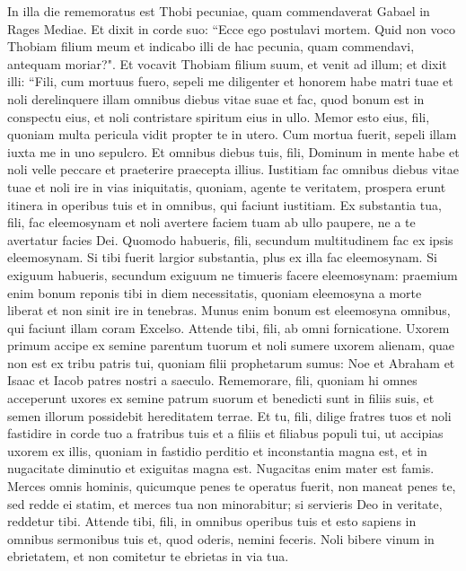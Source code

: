 \begin{biblechapter}  
\verse In illa die rememoratus est Thobi pecuniae, quam commendaverat Gabael in Rages Mediae. 
\verse Et dixit in corde suo: “Ecce ego postulavi mortem. Quid non voco Thobiam filium meum et indicabo illi de hac pecunia, quam commendavi, antequam moriar?". 
\verse Et vocavit Thobiam filium suum, et venit ad illum; et dixit illi: “Fili, cum mortuus fuero, sepeli me diligenter et honorem habe matri tuae et noli derelinquere illam omnibus diebus vitae suae et fac, quod bonum est in conspectu eius, et noli contristare spiritum eius in ullo. 
\verse Memor esto eius, fili, quoniam multa pericula vidit propter te in utero. Cum mortua fuerit, sepeli illam iuxta me in uno sepulcro. 
\verse Et omnibus diebus tuis, fili, Dominum in mente habe et noli velle peccare et praeterire praecepta illius. Iustitiam fac omnibus diebus vitae tuae et noli ire in vias iniquitatis,  
\verse quoniam, agente te veritatem, prospera erunt itinera in operibus tuis et in omnibus, qui faciunt iustitiam. 
\verse Ex substantia tua, fili, fac eleemosynam et noli avertere faciem tuam ab ullo paupere, ne a te avertatur facies Dei.  
\verse Quomodo habueris, fili, secundum multitudinem fac ex ipsis eleemosynam. Si tibi fuerit largior substantia, plus ex illa fac eleemosynam. Si exiguum habueris, secundum exiguum ne timueris facere eleemosynam: 
\verse praemium enim bonum reponis tibi in diem necessitatis, 
\verse quoniam eleemosyna a morte liberat et non sinit ire in tenebras. 
\verse Munus enim bonum est eleemosyna omnibus, qui faciunt illam coram Excelso. 
\verse Attende tibi, fili, ab omni fornicatione. Uxorem primum accipe ex semine parentum tuorum et noli sumere uxorem alienam, quae non est ex tribu patris tui, quoniam filii prophetarum sumus: Noe et Abraham et Isaac et Iacob patres nostri a saeculo. Rememorare, fili, quoniam hi omnes acceperunt uxores ex semine patrum suorum et benedicti sunt in filiis suis, et semen illorum possidebit hereditatem terrae. 
\verse Et tu, fili, dilige fratres tuos et noli fastidire in corde tuo a fratribus tuis et a filiis et filiabus populi tui, ut accipias uxorem ex illis, quoniam in fastidio perditio et inconstantia magna est, et in nugacitate diminutio et exiguitas magna est. Nugacitas enim mater est famis. 
\verse Merces omnis hominis, quicumque penes te operatus fuerit, non maneat penes te, sed redde ei statim, et merces tua non minorabitur; si servieris Deo in veritate, reddetur tibi. Attende tibi, fili, in omnibus operibus tuis et esto sapiens in omnibus sermonibus tuis 
\verse et, quod oderis, nemini feceris. Noli bibere vinum in ebrietatem, et non comitetur te ebrietas in via tua. 

\end{biblechapter}
